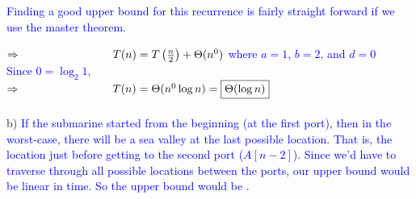 \documentclass[11pt]{article}
\begin{document}
\begin{enumerate}
\textcolor{blue}{ Finding a good upper bound for this recurrence is fairly straight forward if we use the master theorem.}

\textcolor{blue}{
${ \Rightarrow \-\hspace{2.85cm} T(n) = T \left(\frac{n}{2}\right)+\Theta(n^0)}$  where ${a = 1}$, ${b = 2}$, and ${d = 0}$ \\ 
\-\hspace{2cm} Since ${0 = \log_2 1}$,\\
${ \Rightarrow \-\hspace{2.85cm} T(n) = \Theta(n^0 \log n) = \boxed{\Theta(\log n)}}$\\
}
\- \\
b)
\textcolor{blue}{ If the submarine started from the beginning (at the first port), then in the worst-case, there will be a sea valley at the last possible location. That is, the location just before getting to the second port ($A[n-2]$). Since we'd have to traverse through all possible locations between the ports, our upper bound would be linear in time. So the upper bound would be .}

\end{enumerate}
\end{document}
